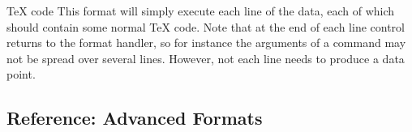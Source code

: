 \begin{dataformat}{TeX code}
  This format will simply execute each line of the data, each of which
  should contain some normal TeX code. Note that at the end of each
  line control returns to the format handler, so for instance the
  arguments of a command may not be spread over several
  lines. However, not each line needs to produce a data point.
  \begin{codeexample}[]
  \end{codeexample}  
\end{dataformat}


\subsection{Reference: Advanced Formats}

